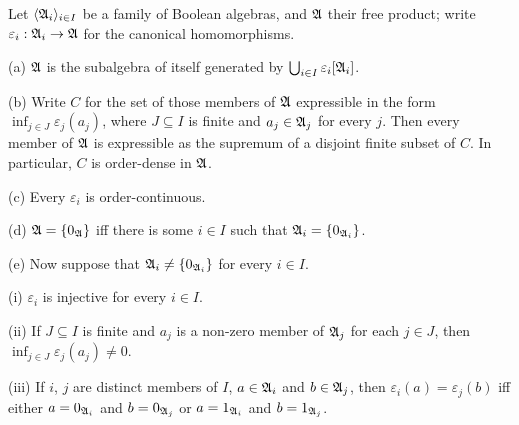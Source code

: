 Let $\langle\frak A_i\rangle_{i\in I}$ be a
family of Boolean algebras, and $\frak A$ their free product;  write
$\varepsilon_i:\frak A_i\to\frak A$ for the canonical homomorphisms.

(a) $\frak A$ is the subalgebra of itself generated by
$\bigcup_{i\in I}\varepsilon_i[\frak A_i]$.

(b) Write $C$ for the set of those members of $\frak A$ expressible in
the form $\inf_{j\in J}\varepsilon_j(a_j)$, where $J\subseteq I$ is
finite and $a_j\in\frak A_j$ for every $j$.   Then every member of
$\frak A$ is expressible as the supremum of a disjoint finite subset of
$C$.   In particular, $C$ is order-dense in $\frak A$.

(c) Every $\varepsilon_i$ is order-continuous.

(d) $\frak A=\{0_{\frak A}\}$ iff there is some $i\in I$ such that
$\frak A_i=\{0_{\frak A_i}\}$.

(e) Now suppose that $\frak A_i\ne\{0_{\frak A_i}\}$ for every $i\in I$.

\quad (i) $\varepsilon_i$ is injective for every $i\in I$.

\quad (ii) If $J\subseteq I$ is finite and $a_j$ is a non-zero member of
$\frak A_j$ for each $j\in J$, then
$\inf_{j\in J}\varepsilon_j(a_j)\ne 0$.

\quad (iii) If $i$, $j$ are distinct members of $I$, $a\in\frak A_i$ and
$b\in\frak A_j$, then $\varepsilon_i(a)=\varepsilon_j(b)$ iff either
$a=0_{\frak A_i}$ and $b=0_{\frak A_j}$ or $a=1_{\frak A_i}$ and
$b=1_{\frak
A_j}$.

